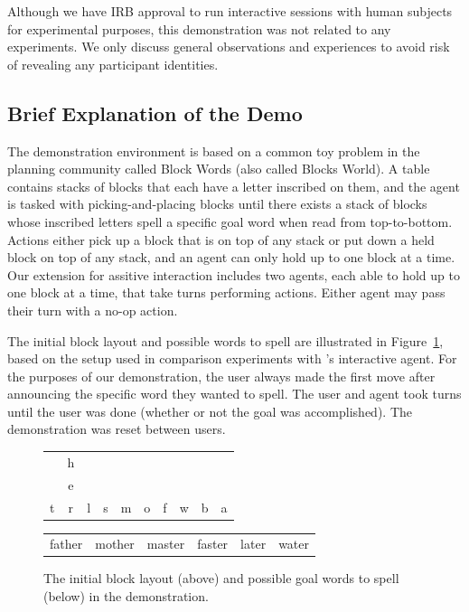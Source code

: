 \documentclass[letterpaper]{article} %
\begin{document}
Although we have IRB approval to run interactive sessions with human subjects for experimental purposes, this demonstration was not related to any experiments. %
We %
only discuss general observations and experiences to avoid risk of revealing any participant identities.

\subsection{Brief Explanation of the Demo\label{sec:challenges.demo}}
The demonstration environment is based on a common toy problem in the planning community called Block Words (also called Blocks World).  A table contains stacks of blocks that each have a letter inscribed on them, and the agent is tasked with picking-and-placing blocks until there exists a stack of blocks whose inscribed letters spell a specific goal word when read from top-to-bottom.  Actions either pick up a block that is on top of any stack or put down a held block on top of any stack, and an agent can only hold up to one block at a time.  Our extension for assitive interaction includes two agents, each able to hold up to one block at a time, that take turns performing actions.  Either agent may pass their turn with a no-op action.

The initial block layout and possible words to spell are illustrated in Figure~\ref{fig:blockwordsDemo}, based on the setup %
used in comparison experiments with \citeauthor{thesis_levine}'s  interactive agent. %
For the purposes of our demonstration, the user always made the first move after announcing the specific word they wanted to spell. %
The user and agent took turns until the user was done (whether or not the goal was accomplished).  The demonstration was reset between users. %

\begin{figure}
\centering
\begin{tabular}{cccccccccc}
& h & & & & & & & &  \\
& e & & & & & & & &  \\
t & r & l & s & m & o & f & w & b & a \\
\hline
\end{tabular}
\begin{tabular}{cccccc}
father & mother & master & faster & later & water \\
\end{tabular}
\caption{The initial block layout (above) and possible goal words to spell (below) in the demonstration.\label{fig:blockwordsDemo}}
\end{figure}
\end{document}
